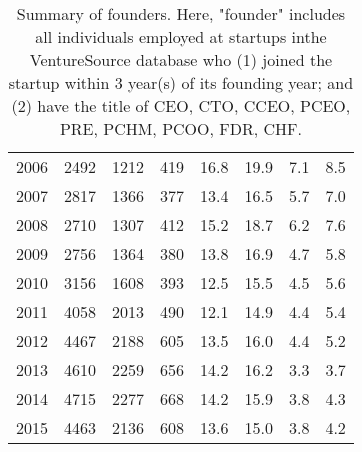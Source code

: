 \begin{table}[!htb]
\begin{tabular}{p{1.75cm}p{1.75cm}p{1.75cm}p{1.75cm}p{1.75cm}p{1.75cm}p{1.75cm}p{1.75cm}}
  2006 & 2492 & 1212 & 419 & 16.8 & 19.9 & 7.1 & 8.5 \\ 
  2007 & 2817 & 1366 & 377 & 13.4 & 16.5 & 5.7 & 7.0 \\ 
  2008 & 2710 & 1307 & 412 & 15.2 & 18.7 & 6.2 & 7.6 \\ 
  2009 & 2756 & 1364 & 380 & 13.8 & 16.9 & 4.7 & 5.8 \\ 
  2010 & 3156 & 1608 & 393 & 12.5 & 15.5 & 4.5 & 5.6 \\ 
  2011 & 4058 & 2013 & 490 & 12.1 & 14.9 & 4.4 & 5.4 \\ 
  2012 & 4467 & 2188 & 605 & 13.5 & 16.0 & 4.4 & 5.2 \\ 
  2013 & 4610 & 2259 & 656 & 14.2 & 16.2 & 3.3 & 3.7 \\ 
  2014 & 4715 & 2277 & 668 & 14.2 & 15.9 & 3.8 & 4.3 \\ 
  2015 & 4463 & 2136 & 608 & 13.6 & 15.0 & 3.8 & 4.2 \\ 
   \bottomrule
\end{tabular}
\endgroup
\caption{Summary of founders. Here, "founder" includes all individuals employed at startups inthe VentureSource database who (1) joined the startup within 3 year(s) of its founding year; and (2) have the title of CEO, CTO, CCEO, PCEO, PRE, PCHM, PCOO, FDR, CHF.} 
\label{table:GStable_founder2}
\end{table}
